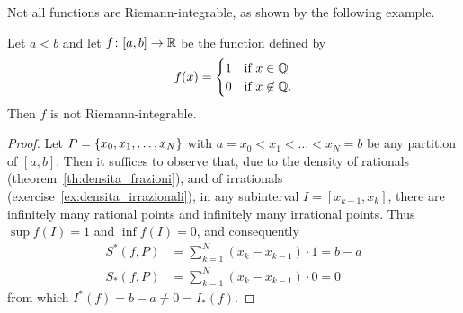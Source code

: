 Not all functions are Riemann-integrable, as shown by the following example.
\begin{example}
\mymark{**}
Let $a<b$ and let $f\colon[a,b]\to {\mathbb R}$ be the function defined by
\[
 f(x) =
 \begin{cases}
   1 & \text{if $x\in {\mathbb Q}$}\\
   0 & \text{if $x\not \in {\mathbb Q}$}.
 \end{cases}
\]
Then $f$ is not Riemann-integrable.
\end{example}
%
\begin{proof}
\mymark{*}
Let $P={\left\{ x_0, x_1, \dots, x_N \right\}}$ with $a=x_0 < x_1 < \dots < x_N = b$
be any partition of $[a,b]$.
Then it suffices to observe that, due to the density of rationals
(theorem~\ref{th:densita_frazioni}),
and of irrationals (exercise~\ref{ex:densita_irrazionali}),
in any subinterval $I=[x_{k-1}, x_k]$, there are infinitely many rational points
and infinitely many irrational points. Thus $\sup f(I)=1$ and $\inf f(I)=0$, and
consequently
\begin{align*}
  S^*(f,P) &= \sum_{k=1}^N (x_k - x_{k-1})\cdot 1 = b-a \\
  S_*(f,P) &= \sum_{k=1}^N (x_k - x_{k-1})\cdot 0 = 0
\end{align*}
from which $I^*(f) = b-a \neq 0 = I_*(f)$.
\end{proof}